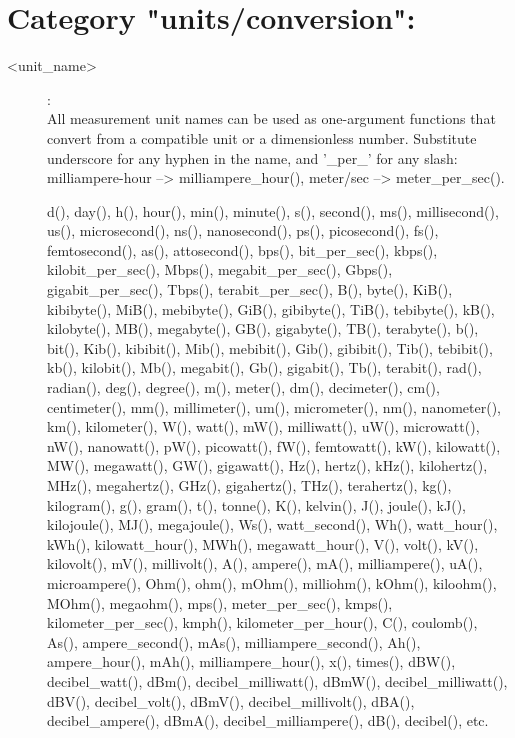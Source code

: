 \section{Category "units/conversion":}
\label{sec:ned-functions:category-units-conversion}

\begin{description}
\item[<unit\_name>]:  \\
    All measurement unit names can be used as one-argument functions that
    convert from a compatible unit or a dimensionless number. Substitute
    underscore for any hyphen in the name, and '\_per\_' for any slash:
    milliampere-hour --> milliampere\_hour(), meter/sec --> meter\_per\_sec().

    d(), day(), h(), hour(), min(), minute(), s(), second(), ms(),
    millisecond(), us(), microsecond(), ns(), nanosecond(), ps(), picosecond(),
    fs(), femtosecond(), as(), attosecond(), bps(), bit\_per\_sec(), kbps(),
    kilobit\_per\_sec(), Mbps(), megabit\_per\_sec(), Gbps(), gigabit\_per\_sec(),
    Tbps(), terabit\_per\_sec(), B(), byte(), KiB(), kibibyte(), MiB(),
    mebibyte(), GiB(), gibibyte(), TiB(), tebibyte(), kB(), kilobyte(), MB(),
    megabyte(), GB(), gigabyte(), TB(), terabyte(), b(), bit(), Kib(),
    kibibit(), Mib(), mebibit(), Gib(), gibibit(), Tib(), tebibit(), kb(),
    kilobit(), Mb(), megabit(), Gb(), gigabit(), Tb(), terabit(), rad(),
    radian(), deg(), degree(), m(), meter(), dm(), decimeter(), cm(),
    centimeter(), mm(), millimeter(), um(), micrometer(), nm(), nanometer(),
    km(), kilometer(), W(), watt(), mW(), milliwatt(), uW(), microwatt(), nW(),
    nanowatt(), pW(), picowatt(), fW(), femtowatt(), kW(), kilowatt(), MW(),
    megawatt(), GW(), gigawatt(), Hz(), hertz(), kHz(), kilohertz(), MHz(),
    megahertz(), GHz(), gigahertz(), THz(), terahertz(), kg(), kilogram(), g(),
    gram(), t(), tonne(), K(), kelvin(), J(), joule(), kJ(), kilojoule(), MJ(),
    megajoule(), Ws(), watt\_second(), Wh(), watt\_hour(), kWh(),
    kilowatt\_hour(), MWh(), megawatt\_hour(), V(), volt(), kV(), kilovolt(),
    mV(), millivolt(), A(), ampere(), mA(), milliampere(), uA(), microampere(),
    Ohm(), ohm(), mOhm(), milliohm(), kOhm(), kiloohm(), MOhm(), megaohm(),
    mps(), meter\_per\_sec(), kmps(), kilometer\_per\_sec(), kmph(),
    kilometer\_per\_hour(), C(), coulomb(), As(), ampere\_second(), mAs(),
    milliampere\_second(), Ah(), ampere\_hour(), mAh(), milliampere\_hour(), x(),
    times(), dBW(), decibel\_watt(), dBm(), decibel\_milliwatt(), dBmW(),
    decibel\_milliwatt(), dBV(), decibel\_volt(), dBmV(), decibel\_millivolt(),
    dBA(), decibel\_ampere(), dBmA(), decibel\_milliampere(), dB(), decibel(),
    etc.
\end{description}

